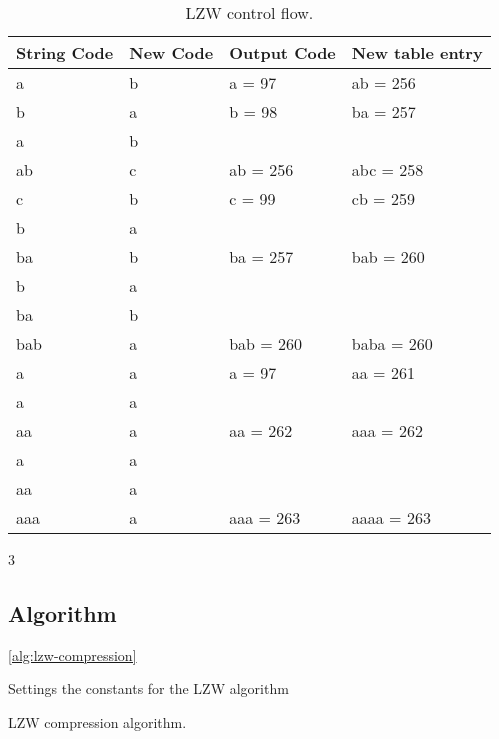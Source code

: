\begin{refsection}
\begin{table}
  \centering
  \newcommand{\lzwrow}[4]{#1 & #2 & #3 & #4 \\}
  \begin{tabular}{llll}
    \toprule
    String Code & New Code & Output Code & New table entry \\
    \midrule

    \lzwrow{a}{b}{a = 97}{ab = 256}
    \lzwrow{b}{a}{b = 98}{ba = 257}
    \lzwrow{a}{b}{}{}
    \lzwrow{ab}{c}{ab = 256}{abc = 258}
    \lzwrow{c}{b}{c = 99}{cb = 259}
    \lzwrow{b}{a}{}{}
    \lzwrow{ba}{b}{ba = 257}{bab = 260}
    \lzwrow{b}{a}{}{}
    \lzwrow{ba}{b}{}{}
    \lzwrow{bab}{a}{bab = 260}{baba = 260}
    \lzwrow{a}{a}{a = 97}{aa = 261}
    \lzwrow{a}{a}{}{}
    \lzwrow{aa}{a}{aa = 262}{aaa = 262}
    \lzwrow{a}{a}{}{}
    \lzwrow{aa}{a}{}{}
    \lzwrow{aaa}{a}{aaa = 263}{aaaa = 263}

    \bottomrule
  \end{tabular}
  \caption{LZW control flow.}
  \label{tab:lzw-walkthru}
\end{table}

3\subsection{Algorithm}

\ref{alg:lzw-compression}


\begin{algorithm}[H]
  \caption{Settings the constants for the LZW algorithm}
  \label{alg:lzw-constants}
  \begin{algorithmic}[1]
  \end{algorithmic}
\end{algorithm}

\begin{algorithm}[H]
  \caption{LZW compression algorithm.}
  \label{alg:lzw-compression}
  \begin{algorithmic}[1]
    \EndFor



    \While{\neof}

       
      \Else {}
        \State {}


\end{algorithmic}
\end{algorithm}
\end{refsection}
